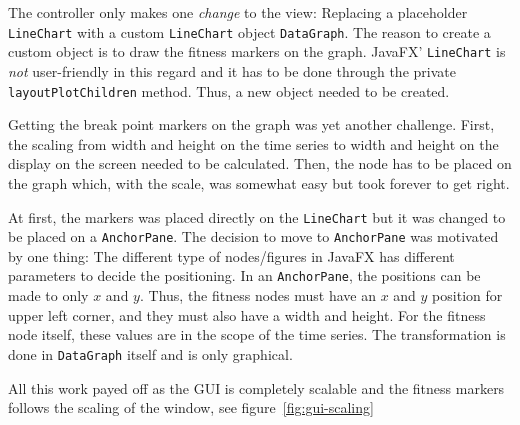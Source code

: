 The controller only makes one \textit{change} to the view: Replacing a
placeholder \texttt{LineChart} with a custom \texttt{LineChart} object
\texttt{DataGraph}. The reason to create a custom object is to draw the fitness
markers on the graph. JavaFX' \texttt{LineChart} is \textit{not} user-friendly
in this regard and it has to be done through the private
\texttt{layoutPlotChildren} method. Thus, a new object needed to be created. 

Getting the break point markers on the graph was yet another challenge. First,
the scaling from width and height on the time series to width and height on the
display on the screen needed to be calculated. Then, the node has to be placed
on the graph which, with the scale, was somewhat easy but took forever to get
right.  

At first, the markers was placed directly on the \texttt{LineChart} but it
was changed to be placed on a \texttt{AnchorPane}. The decision to move to
\texttt{AnchorPane} was motivated by one thing: The different type of
nodes/figures in JavaFX has different parameters to decide the positioning. In
an \texttt{AnchorPane}, the positions can be made to only $x$ and $y$. Thus, the
fitness nodes must have an $x$ and $y$ position for upper left corner, and they
must also have a width and height. For the fitness node itself, these values are
in the scope of the time series. The transformation is done in
\texttt{DataGraph} itself
and is only graphical. 

All this work payed off as the GUI is completely scalable and the fitness
markers follows the scaling of the window, see figure~\ref{fig:gui-scaling}

